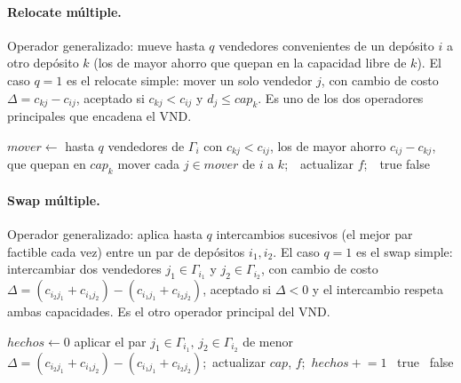 \documentclass[11pt,a4paper]{article}
\begin{document}
\paragraph{Relocate múltiple.} Operador generalizado: mueve hasta $q$ vendedores convenientes de
un depósito $i$ a otro depósito $k$ (los de mayor ahorro que quepan en la capacidad libre de $k$).
El caso $q{=}1$ es el relocate simple: mover un solo vendedor $j$, con cambio de costo
$\Delta = c_{kj}-c_{ij}$, aceptado si $c_{kj}<c_{ij}$ y $d_j\le cap_k$. Es uno de los dos
operadores principales que encadena el VND.

\begin{algorithm}[H]
\caption{Operador \emph{relocate múltiple} (primera mejora)}
\begin{algorithmic}[1]
    \State $mover \gets$ hasta $q$ vendedores de $\Gamma_i$ con $c_{kj}<c_{ij}$, los de mayor ahorro $c_{ij}-c_{kj}$, que quepan en $cap_k$
      \State mover cada $j\in mover$ de $i$ a $k$;\ \ actualizar $f$;\ \ \Return true
    \EndIf
  \EndFor
  \State \Return false
\EndFunction
\end{algorithmic}
\end{algorithm}

\paragraph{Swap múltiple.} Operador generalizado: aplica hasta $q$ intercambios sucesivos (el
mejor par factible cada vez) entre un par de depósitos $i_1,i_2$. El caso $q{=}1$ es el swap
simple: intercambiar dos vendedores $j_1\in\Gamma_{i_1}$ y $j_2\in\Gamma_{i_2}$, con cambio de
costo $\Delta = (c_{i_2 j_1}+c_{i_1 j_2})-(c_{i_1 j_1}+c_{i_2 j_2})$, aceptado si $\Delta<0$ y el
intercambio respeta ambas capacidades. Es el otro operador principal del VND.

\begin{algorithm}[H]
\caption{Operador \emph{swap múltiple} (primera mejora)}
\begin{algorithmic}[1]
    \State $hechos \gets 0$
      \State aplicar el par $j_1\in\Gamma_{i_1},\,j_2\in\Gamma_{i_2}$ de menor $\Delta=(c_{i_2 j_1}+c_{i_1 j_2})-(c_{i_1 j_1}+c_{i_2 j_2})$;\ actualizar $cap$, $f$;\ $hechos \mathrel{+}= 1$
    \EndWhile
    \ \Return true\ \EndIf
  \EndFor
  \State \Return false
\EndFunction
\end{algorithmic}
\end{algorithm}
\end{document}
